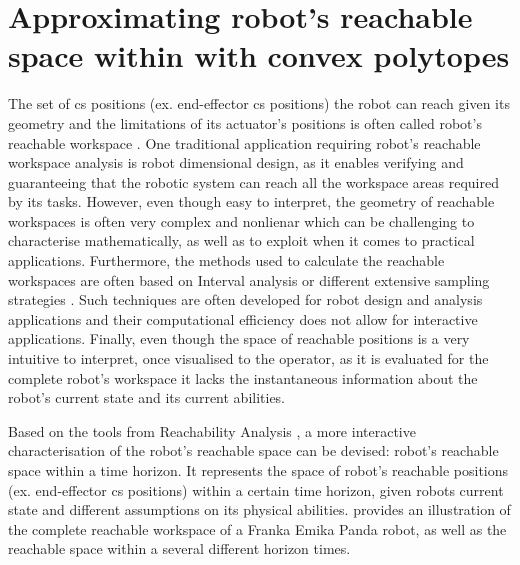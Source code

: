 
\section{Approximating robot's reachable space within with convex polytopes}
\label{ch:hfr}

The set of \gls{cs} positions (ex. end-effector \gls{cs} positions) the robot can reach given its geometry and the limitations of its actuator's positions is often called robot's reachable workspace \cite{Gosselin1991Synthesis,Vahrenkamp2016,kucuk2005robot}. One traditional application requiring robot's reachable workspace analysis is robot dimensional design, as it enables verifying and guaranteeing that the robotic system can reach all the workspace areas required by its tasks. However, even though easy to interpret, the geometry of reachable workspaces is often very complex and nonlienar which can be challenging to characterise mathematically, as well as to exploit when it comes to practical applications. Furthermore, the methods used to calculate the reachable workspaces are often based on Interval analysis \cite{gouttefarde2011interval} or different extensive sampling strategies \cite{Vahrenkamp2016,Zacharias2007}. Such techniques are often developed for robot design and analysis applications and their computational efficiency does not allow for interactive applications. Finally, even though the space of reachable positions is a very intuitive to interpret, once visualised to the operator, as it is evaluated for the complete robot's workspace it lacks the instantaneous information about the robot's current state and its current abilities.

Based on the tools from Reachability Analysis \cite{althoff2010reachability,althoff2014}, a more interactive characterisation of the robot's reachable space can be devised: robot's reachable space within a time horizon. It represents the space of robot's reachable positions (ex. end-effector \gls{cs} positions) within a certain time horizon, given robots current state and different assumptions on its physical abilities.  provides an illustration of the complete reachable workspace of a Franka Emika Panda robot, as well as the reachable space within a several different horizon times.

